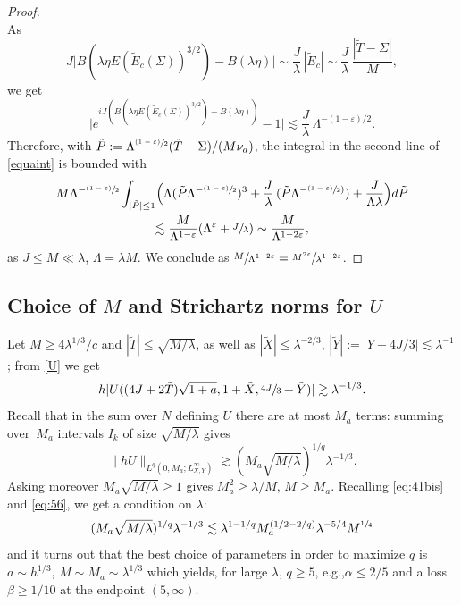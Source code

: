 \documentclass[11pt]{article}
\newcommand{\eg}{e.g.,\xspace}
\newcommand{\psfrac}[2]{\sfrac{(#1)}{#2}}
\let\epsilon\varepsilon
\theoremstyle{plain}
\theoremstyle{definition}
\begin{document}
\begin{proof}
\[\]
As
\[
J\bigl|B(\lambda\eta E(\tilde E_c(\Sigma))^{3/2})-B(\lambda\eta)\bigr|\sim \frac{J}{\lambda}\,|\tilde E_c|\sim\frac{J}{\lambda}\,\frac{|\tilde T-\Sigma|}{M},
\]
we get
\[
\bigl|e^{iJ(B(\lambda\eta E(\tilde E_c(\Sigma))^{3/2})-B(\lambda\eta))}-1\bigl|\lesssim \frac{J}{\lambda}\,\Lambda^{-(1-\epsilon)/2}.
\]
Therefore, with $\tilde P:=\Lambda^{\psfrac{1-\epsilon}{2}}(\tilde T-\Sigma)/(M\nu_a)$, the integral in the second line of \eqref{equaint} is bounded with
\begin{multline*}
M\Lambda^{-\psfrac{1-\epsilon}{2}}\int_{|\tilde P|\leq 1}\Bigl(\Lambda (\tilde P \Lambda^{-\psfrac{1-\epsilon}2})^3+\frac{J}{\lambda}\,(\tilde P\Lambda^{-\psfrac {1-\epsilon}2)})+\frac{J}{\Lambda\lambda}\Bigr)d\tilde P\\
\lesssim \frac{M}{\Lambda^{1-\epsilon}}(\Lambda^{\epsilon}+\sfrac{J}{\lambda})\sim \frac{M}{\Lambda^{1-2\epsilon}},
\end{multline*}
as $J\leq M\ll \lambda$, $\Lambda=\lambda M$. We conclude as $ \sfrac{M}{\Lambda^{1-2\epsilon}}=\sfrac{M^{2\epsilon}}{\lambda^{1-2\epsilon}}$.
\end{proof}

\subsection{Choice of $M$ and Strichartz norms for $U$}

Let $M\geq 4\lambda^{1/3}/c$ and $|\tilde T|\leq \sqrt{M/\lambda}$, as well as $|\tilde X|\leq \lambda^{-2/3}$, $|\tilde Y|:=|Y-4J/3|\lesssim \lambda^{-1}$; from \eqref{U} we get
\begin{equation*}
\label{eq:75}
h |U((4J+2\tilde T)\sqrt{1+a},1+\tilde X,\sfrac{4J}{3}+ \tilde Y)|\gtrsim \lambda^{-1/3} .
\end{equation*}
Recall that in the sum over $N$ defining $U$ there are at most $M_a$ terms: summing over~$M_a$ intervals $I_{k}$ of size $\sqrt{M/\lambda}$ gives
\begin{equation*}
\label{eq:76}
\|h U\|_{L^{q}(0,M_a; L^{\infty}_{X,Y})} \gtrsim (M_a\sqrt{M/\lambda})^{1/q}\lambda^{-1/3}.
\end{equation*}
Asking moreover $M_a\sqrt{M/\lambda}\geq 1$ gives $M_a^2\geq \lambda/M$, $M\geq M_a$.
Recalling \eqref{eq:41bis} and \eqref{eq:56}, we get a condition on $\lambda$:
\begin{equation*}
\label{eq:77}
(M_a\sqrt{M/\lambda})^{1/q} \lambda^{-1/3}\lesssim \lambda^{1-1/q} M_{a}^{(1/2-2/q)}\lambda^{-5/4} M^{\sfrac 14}
\end{equation*}
and it turns out that the best choice of parameters in order to maximize $q$ is $a\sim h^{1/3}$, $M\sim M_a\sim \lambda^{1/3}$ which yields, for large $\lambda$, $q\geq 5$, \eg $\alpha\leq 2/5$ and a loss $\beta\geq 1/10$ at the endpoint $(5,\infty)$.
\end{document}
